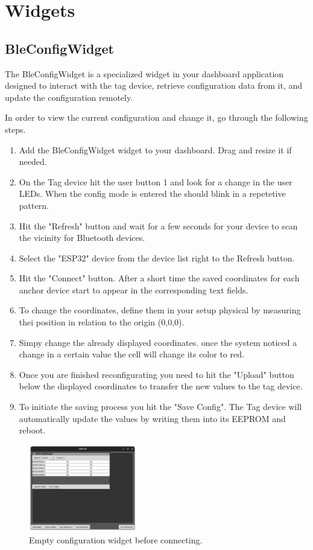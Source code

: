 \chapter{Widgets}

 
\section{BleConfigWidget}

The BleConfigWidget is a specialized widget in your dashboard application designed to interact with the tag device, retrieve configuration data from it, and update the configuration remotely. 

In order to view the current configuration and change it, go through the following steps. 
%
\begin{enumerate}
	\item Add the BleConfigWidget widget to your dashboard. Drag and resize it if needed. 
	\item On the Tag device hit the user button 1 and look for a change in the user LEDs. When the config mode is entered the should blink in a repetetive pattern. 
	\item Hit the "Refresh" button and wait for a few seconds for your device to scan the vicinity for Bluetooth devices. 
	\item Select the "ESP32" device from the device list right to the Refresh button. 
	\item Hit the "Connect" button. After a short time the saved coordinates for each anchor device start to appear in the corresponding text fields. 
	\item To change the coordinates, define them in your setup physical by measuring thei position in relation to the origin (0,0,0). 
	\item Simpy change the already displayed coordinates. once the system noticed a change in a certain value the cell will change its color to red. 
	\item Once you are finished reconfigurating you need to hit the "Upload" button below the displayed coordinates to transfer the new values to the tag device. 
	\item To initiate the saving process you hit the "Save Config". The Tag device will automatically update the values by writing them into its EEPROM and reboot. 
\end{enumerate}
%
\newpage
%
\begin{figure}[!hbt]
	\centering
	\includegraphics[width=0.42\textwidth]{pictures/cofig_device_idle.png}
	\caption{Empty configuration widget before connecting.}
	\label{fig:cofig_device_idle}
\end{figure}

